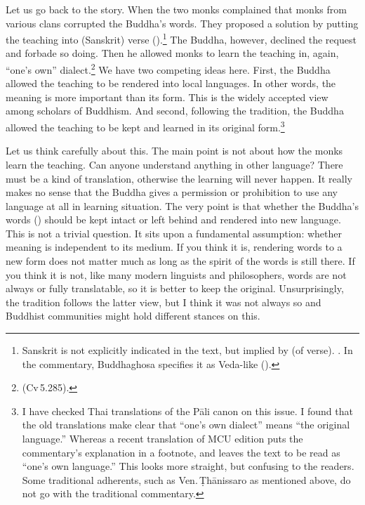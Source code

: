 Let us go back to the story. When the two monks complained that monks from various clans corrupted the Buddha's words. They proposed a solution by putting the teaching into (Sanskrit) verse ().\footnote{Sanskrit is not explicitly indicated in the text, but implied by  (of verse). \citealp[See][p.~150]{rhys:vinaya3}. In the commentary, Buddhaghosa specifies it as Veda-like ().} The Buddha, however, declined the request and forbade so doing. Then he allowed monks to learn the teaching in, again, ``one's own'' dialect.\footnote{ (Cv\,5.285).} We have two competing ideas here. First, the Buddha allowed the teaching to be rendered into local languages. In other words, the meaning is more important than its form. This is the widely accepted view among scholars of Buddhism. And second, following the tradition, the Buddha allowed the teaching to be kept and learned in its original form.\footnote{I have checked Thai translations of the P\=ali canon on this issue. I found that the old translations make clear that ``one's own dialect'' means ``the original language.'' Whereas a recent translation of MCU edition puts the commentary's explanation in a footnote, and leaves the text to be read as ``one's own language.'' This looks more straight, but confusing to the readers. Some traditional adherents, such as Ven.\,\d Th\=anissaro as mentioned above, do not go with the traditional commentary.}

Let us think carefully about this. The main point is not about how the monks learn the teaching. Can anyone understand anything in other language? There must be a kind of translation, otherwise the learning will never happen. It really makes no sense that the Buddha gives a permission or prohibition to use any language at all in learning situation. The very point is that whether the Buddha's words () should be kept intact or left behind and rendered into new language. This is not a trivial question. It sits upon a fundamental assumption: whether meaning is independent to its medium. If you think it is, rendering words to a new form does not matter much as long as the spirit of the words is still there. If you think it is not, like many modern linguists and philosophers, words are not always or fully translatable, so it is better to keep the original. Unsurprisingly, the tradition follows the latter view, but I think it was not always so and Buddhist communities might hold different stances on this.

